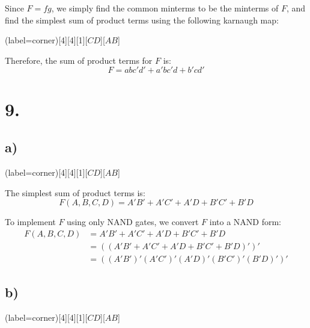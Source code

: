 \documentclass[a4paper,12pt]{article}
\begin{document}
Since $F=fg$, we simply find the common minterms to be the minterms of $F$, and find the simplest sum of product terms using the following karnaugh map:
\begin{center}
	\begin{karnaugh-map}(label=corner)[4][4][1][$CD$][$AB$]
		\autoterms[0]
	\end{karnaugh-map}
\end{center}

Therefore, the sum of product terms for $F$ is:
\begin{equation*}
	\boxed{F = abc'd'+a'bc'd+b'cd'}
\end{equation*}

\section*{9.}

\subsection*{a)}
\begin{center}
	\begin{karnaugh-map}(label=corner)[4][4][1][$CD$][$AB$]
	\end{karnaugh-map}
\end{center}

The simplest sum of product terms is:
\begin{equation*}
	F(A,B,C,D) = A'B'+A'C'+A'D+B'C'+B'D
\end{equation*}

To implement $F$ using only NAND gates, we convert $F$ into a NAND form:
\begin{align*}
	F(A,B,C,D) &= A'B'+A'C'+A'D+B'C'+B'D\\
	&= ((A'B'+A'C'+A'D+B'C'+B'D)')'\\
	&= \boxed{((A'B')'(A'C')'(A'D)'(B'C')'(B'D)')'}
\end{align*}

\subsection*{b)}
\begin{center}
	\begin{karnaugh-map}(label=corner)[4][4][1][$CD$][$AB$]
	\end{karnaugh-map}
\end{center}
\end{document}
